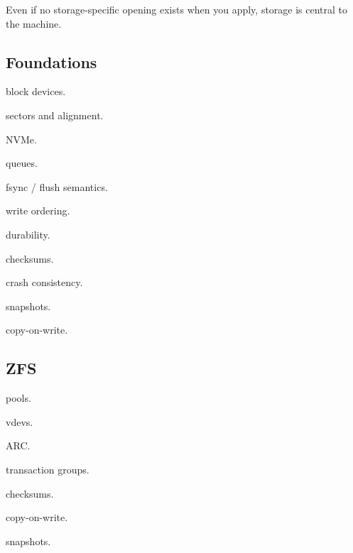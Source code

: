 \documentclass[11pt,letterpaper]{article}
\begin{document}
\label{stage:6}

Even if no storage-specific opening exists when you apply, storage is central to the machine.

\subsection*{Foundations}

\begin{topics}

\item block devices.

\item sectors and alignment.

\item NVMe.

\item queues.

\item fsync / flush semantics.

\item write ordering.

\item durability.

\item checksums.

\item crash consistency.

\item snapshots.

\item copy-on-write.

\end{topics}

\subsection*{ZFS}

\begin{topics}

\item pools.

\item vdevs.

\item ARC.

\item transaction groups.

\item checksums.

\item copy-on-write.

\item snapshots.

\end{topics}
\end{document}
